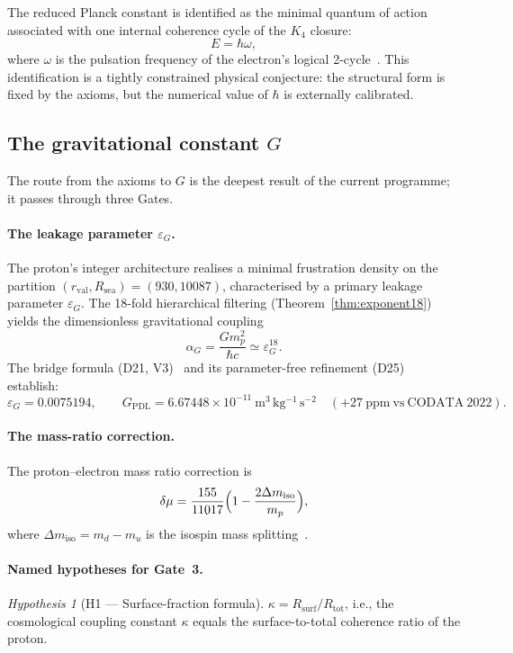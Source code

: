 \documentclass[11pt,a4paper]{article}
\theoremstyle{plain}
\theoremstyle{definition}
\theoremstyle{remark}
\newtheorem{hypothesis}[theorem]{Hypothesis}
\newcommand{\Kfour}{K_4}
\newcommand{\GPDL}{G_{\mathrm{PDL}}}
\newcommand{\epsG}{\varepsilon_G}
\newcommand{\rval}{r_{\mathrm{val}}}
\newcommand{\Rsurf}{R_{\mathrm{surf}}}
\newcommand{\Rtot}{R_{\mathrm{tot}}}
\begin{document}
The reduced Planck constant is identified as the minimal quantum of action associated with one internal coherence cycle of the $\Kfour$ closure:
\[
E = \hbar\omega,
\]
where $\omega$ is the pulsation frequency of the electron's logical 2-cycle~\citep{D01,D02}.
This identification is a \textcolor{conjecturegreen}{tightly constrained physical conjecture}: the structural form is fixed by the axioms, but the numerical value of $\hbar$ is externally calibrated.

\subsection{The gravitational constant \texorpdfstring{$G$}{G}}
\label{subsec:G}

The route from the axioms to $G$ is the deepest result of the current programme; it passes through three Gates.

\paragraph{The leakage parameter $\epsG$.}
The proton's integer architecture realises a minimal frustration density on the partition $(\rval, R_{\mathrm{sea}}) = (930, 10087)$, characterised by a primary leakage parameter $\epsG$.
The 18-fold hierarchical filtering (Theorem~\ref{thm:exponent18}) yields the dimensionless gravitational coupling
\[
\alpha_G = \frac{G m_p^2}{\hbar c} \simeq \epsG^{18}.
\]
The bridge formula (D21, V3)~\citep{D21} and its parameter-free refinement (D25)~\citep{D25} establish:
\[
\epsG = 0.0075194, \qquad \GPDL = 6.67448\times 10^{-11}~\mathrm{m^3\,kg^{-1}\,s^{-2}} \quad (+27~\mathrm{ppm~vs~CODATA~2022}).
\]

\paragraph{The mass-ratio correction.}
The proton--electron mass ratio correction is
\[
\delta\mu = \frac{155}{11017}\Bigl(1 - \frac{2\Delta m_{\mathrm{iso}}}{m_p}\Bigr),
\]
where $\Delta m_{\mathrm{iso}} = m_d - m_u$ is the isospin mass splitting~\citep{D28}.

\paragraph{Named hypotheses for Gate~3.}

\begin{hypothesis}[H1 — Surface-fraction formula]
$\kappa = \Rsurf/\Rtot$, i.e., the cosmological coupling constant $\kappa$ equals the surface-to-total coherence ratio of the proton.
\end{hypothesis}
\end{document}
